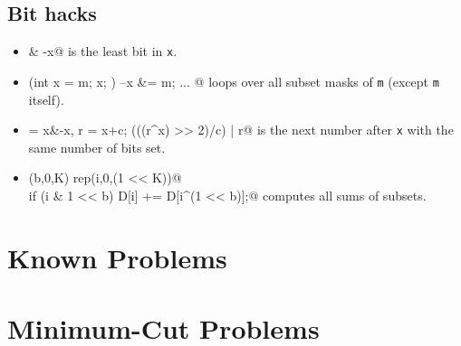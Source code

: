 	\subsection{Bit hacks}
		\begin{itemize}
			\item \verb@x & -x@ is the least bit in \texttt{x}.
			\item \verb@for (int x = m; x; ) { --x &= m; ... }@ loops over all subset masks of \texttt{m} (except \texttt{m} itself).
			\item \verb@c = x&-x, r = x+c; (((r^x) >> 2)/c) | r@ is the next number after \texttt{x} with the same number of bits set.
			\item \verb@rep(b,0,K) rep(i,0,(1 << K))@ \\ \verb@  if (i & 1 << b) D[i] += D[i^(1 << b)];@ computes all sums of subsets.
		\end{itemize}

\section{Known Problems}

\section{Minimum-Cut Problems}
